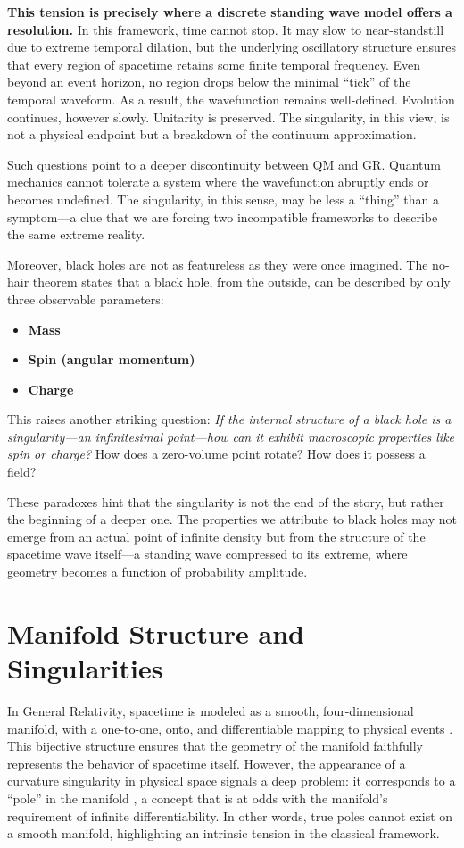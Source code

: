 \documentclass[12pt]{article}
\begin{document}
\textbf{This tension is precisely where a discrete standing wave model offers a resolution.} In this framework, time cannot stop. It may slow to near-standstill due to extreme temporal dilation, but the underlying oscillatory structure ensures that every region of spacetime retains some finite temporal frequency. Even beyond an event horizon, no region drops below the minimal “tick” of the temporal waveform. As a result, the wavefunction remains well-defined. Evolution continues, however slowly. Unitarity is preserved. The singularity, in this view, is not a physical endpoint but a breakdown of the continuum approximation.

Such questions point to a deeper discontinuity between QM and GR. Quantum mechanics cannot tolerate a system where the wavefunction abruptly ends or becomes undefined. The singularity, in this sense, may be less a ``thing'' than a symptom---a clue that we are forcing two incompatible frameworks to describe the same extreme reality.

Moreover, black holes are not as featureless as they were once imagined. The no-hair theorem \citep{wikipedia_no_hair_theorem} states that a black hole, from the outside, can be described by only three observable parameters:
\begin{itemize}
    \item \textbf{Mass}
    \item \textbf{Spin (angular momentum)}
    \item \textbf{Charge}
\end{itemize}

This raises another striking question: \textit{If the internal structure of a black hole is a singularity---an infinitesimal point---how can it exhibit macroscopic properties like spin or charge?} How does a zero-volume point rotate? How does it possess a field?

These paradoxes hint that the singularity is not the end of the story, but rather the beginning of a deeper one. The properties we attribute to black holes may not emerge from an actual point of infinite density but from the structure of the spacetime wave itself---a standing wave compressed to its extreme, where geometry becomes a function of probability amplitude.


\section{Manifold Structure and Singularities}

In General Relativity, spacetime is modeled as a smooth, four-dimensional manifold, with a one-to-one, onto, and differentiable mapping to physical events \citep{waldGR1984}. This bijective structure ensures that the geometry of the manifold faithfully represents the behavior of spacetime itself. However, the appearance of a curvature singularity in physical space signals a deep problem: it corresponds to a “pole” in the manifold \citep{schwarzschild1916}, a concept that is at odds with the manifold’s requirement of infinite differentiability. In other words, true poles cannot exist on a smooth manifold, highlighting an intrinsic tension in the classical framework.
\end{document}
